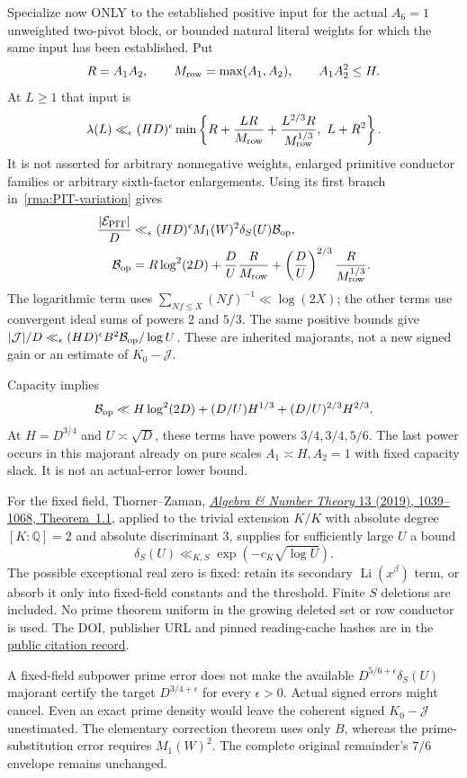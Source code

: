 Specialize now ONLY to the established positive input for the actual $A_6=1$
unweighted two-pivot block, or bounded natural literal weights for which
the same input has been established. Put
\[
 R=A_1A_2,\qquad M_{\rm row}=\max(A_1,A_2),\qquad A_1A_2^2\le H.
\]
At $L\ge1$ that input is
\begin{equation}\label{rma:positive-input}
 \lambda(L)\ll_\epsilon(HD)^\epsilon
 \min\left\{R+\frac{LR}{M_{\rm row}}
       +\frac{L^{2/3}R}{M_{\rm row}^{1/3}},\ L+R^2\right\}.
\end{equation}
It is not asserted for arbitrary nonnegative weights, enlarged primitive
conductor families or arbitrary sixth-factor enlargements. Using its
first branch in~\eqref{rma:PIT-variation} gives
\begin{align}
 \frac{|\mathcal E_{\rm PIT}|}{D}
 &\ll_\epsilon(HD)^\epsilon M_1(W)^2\delta_S(U)\mathcal B_{\rm op},
                  \label{rma:PIT-budget}\\
 \mathcal B_{\rm op}
 &=R\log^2(2D)+\frac{D}{U}\frac{R}{M_{\rm row}}
       +\left(\frac{D}{U}\right)^{2/3}
                              \frac{R}{M_{\rm row}^{1/3}}.
                  \label{rma:Bop}
\end{align}
The logarithmic term uses $\sum_{Nf\le X}(Nf)^{-1}\ll\log(2X)$;
the other terms use convergent ideal sums of powers $2$ and $5/3$.
The same positive bounds give
$|\mathcal J|/D\ll_\epsilon(HD)^\epsilon B^2
\mathcal B_{\rm op}/\log U$. These are inherited majorants, not a new
signed gain or an estimate of $K_0-\mathcal J$.

Capacity implies
\[
 \mathcal B_{\rm op}\ll H\log^2(2D)
       +(D/U)H^{1/3}+(D/U)^{2/3}H^{2/3}.
\]
At $H=D^{3/4}$ and $U\asymp\sqrt D$, these terms have powers
$3/4,3/4,5/6$. The last power occurs in this majorant already on pure
scales $A_1\asymp H,A_2=1$ with fixed capacity slack. It is not an
actual-error lower bound.

For the fixed field, Thorner--Zaman,
\href{https://doi.org/10.2140/ant.2019.13.1039}{\emph{Algebra \& Number Theory}
13 (2019), 1039--1068, Theorem~1.1}, applied to the trivial extension
$K/K$ with absolute degree $[K:\mathbb Q]=2$ and absolute discriminant $3$, supplies for sufficiently
large $U$ a bound
\[
 \delta_S(U)\ll_{K,S}\exp(-c_K\sqrt{\log U}).
\]
The possible exceptional real zero is fixed: retain its secondary
$\operatorname{Li}(x^\beta)$ term, or absorb it only into fixed-field
constants and the threshold. Finite $S$ deletions are included. No
prime theorem uniform in the growing deleted set or row conductor is
used. The DOI, publisher URL and pinned reading-cache hashes are in the
\href{https://github.com/amelie-iska/GRH-research/blob/main/outputs/checks/2026-11-05-rough-mask/main-attempt/PUBLIC-CITATION-v1.json}{public citation record}.

A fixed-field subpower prime error does not make the available
$D^{5/6+\epsilon}\delta_S(U)$ majorant certify the target
$D^{3/4+\epsilon}$ for every $\epsilon>0$. Actual signed errors might
cancel. Even an exact prime density would leave the coherent signed
$K_0-\mathcal J$ unestimated. The elementary correction theorem uses
only $B$, whereas the prime-substitution error requires $M_1(W)^2$.
The complete original remainder's $7/6$ envelope remains unchanged.
